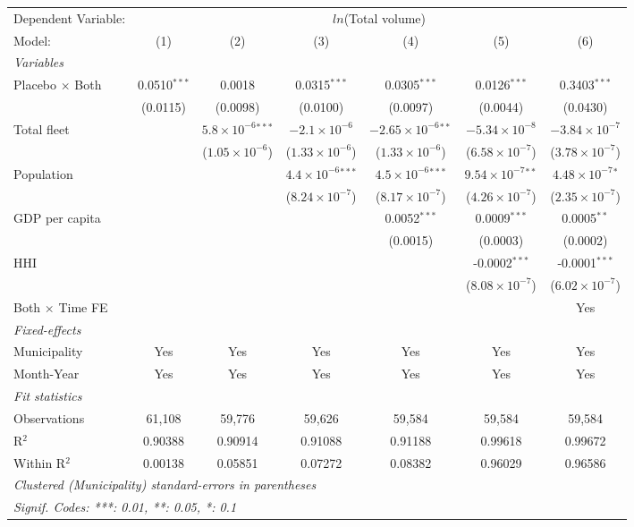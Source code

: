\documentclass[
]{article}
\begin{document}
\begin{tabular}{lcccccc}
\tabularnewline\midrule\midrule
Dependent Variable:&\multicolumn{6}{c}{$ln$(Total volume)}\\
Model:&(1) & (2) & (3) & (4) & (5) & (6)\\
\midrule \emph{Variables}&   &   &   &   &   &  \\
Placebo $\times $ Both & 0.0510$^{***}$ & 0.0018 & 0.0315$^{***}$ & 0.0305$^{***}$ & 0.0126$^{***}$ & 0.3403$^{***}$\\
  &(0.0115) & (0.0098) & (0.0100) & (0.0097) & (0.0044) & (0.0430)\\
Total fleet &    & $5.8\times 10^{-6}$$^{***}$ & $-2.1\times 10^{-6}$ & $-2.65\times 10^{-6}$$^{**}$ & $-5.34\times 10^{-8}$ & $-3.84\times 10^{-7}$\\
  &   & ($1.05\times 10^{-6}$) & ($1.33\times 10^{-6}$) & ($1.33\times 10^{-6}$) & ($6.58\times 10^{-7}$) & ($3.78\times 10^{-7}$)\\
Population &    &    & $4.4\times 10^{-6}$$^{***}$ & $4.5\times 10^{-6}$$^{***}$ & $9.54\times 10^{-7}$$^{**}$ & $4.48\times 10^{-7}$$^{*}$\\
  &   &    & ($8.24\times 10^{-7}$) & ($8.17\times 10^{-7}$) & ($4.26\times 10^{-7}$) & ($2.35\times 10^{-7}$)\\
GDP per capita &    &    &    & 0.0052$^{***}$ & 0.0009$^{***}$ & 0.0005$^{**}$\\
  &   &    &    & (0.0015) & (0.0003) & (0.0002)\\
HHI &    &    &    &    & -0.0002$^{***}$ & -0.0001$^{***}$\\
  &   &    &    &    & ($8.08\times 10^{-7}$) & ($6.02\times 10^{-7}$)\\
Both $\times$ Time FE &  &  &  &  &  & Yes\\
\midrule \emph{Fixed-effects}&   &   &   &   &   &  \\
Municipality & Yes & Yes & Yes & Yes & Yes & Yes\\
Month-Year & Yes & Yes & Yes & Yes & Yes & Yes\\
\midrule \emph{Fit statistics}&  & & & & & \\
Observations & 61,108&59,776&59,626&59,584&59,584&59,584\\
R$^2$ & 0.90388&0.90914&0.91088&0.91188&0.99618&0.99672\\
Within R$^2$ & 0.00138&0.05851&0.07272&0.08382&0.96029&0.96586\\
\midrule\midrule\multicolumn{7}{l}{\emph{Clustered (Municipality) standard-errors in parentheses}}\\
\multicolumn{7}{l}{\emph{Signif. Codes: ***: 0.01, **: 0.05, *: 0.1}}\\
\end{tabular}
\end{document}
